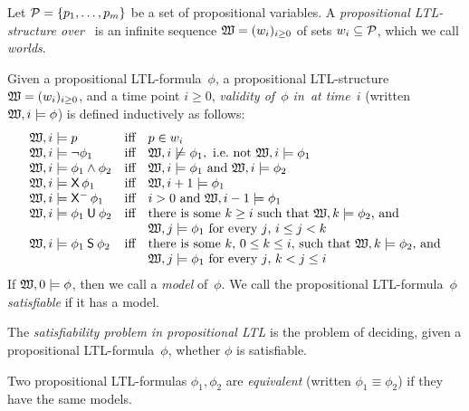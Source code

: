 \begin{definition}\label{def:semantics-ltl}
    Let $\mathcal{P}=\{p_1,\dots,p_m\}$ be a set of propositional variables.  A
    \emph{propositional LTL-structure over~\Pmc} is an infinite sequence
    $\mathfrak{W}=(w_i)_{i\ge 0}$ of sets $w_i\subseteq\mathcal{P}$, which we call
    \emph{worlds}.

    Given a propositional LTL-formula~$\phi$, a propositional LTL-structure
    $\mathfrak{W}=(w_i)_{i\ge 0}$, and a time point $i\ge 0$, \emph{validity of~$\phi$
    in~\Wmf at time~$i$} (written $\mathfrak{W},i\models\phi$) is defined inductively as
    follows:
    \[\begin{array}{lcl}
        \Wmf,i\models p
            &\text{iff}
            &p\in w_i\\
        \Wmf,i\models\lnot\phi_1
            &\text{iff}
            &\Wmf,i\not\models\phi_1,\ \text{i.e.~not}\ \Wmf,i\models\phi_1\\
        \Wmf,i\models\phi_1\land\phi_2
            &\text{iff}
            &\Wmf,i\models\phi_1\ \text{and}\ \Wmf,i\models\phi_2\\
        \Wmf,i\models\Next\phi_1
            &\text{iff}
            &\Wmf,i+1\models\phi_1\\
        \Wmf,i\models\Previous\phi_1
            &\text{iff}
            &i>0\ \text{and}\ \Wmf,i-1\models\phi_1\\
        \Wmf,i\models\phi_1\Until\phi_2
            &\text{iff}
            &\text{there is some $k\geq i$ such that $\Wmf,k\models\phi_2$, and}\\
            & &\text{$\Wmf,j\models\phi_1$ for every $j$, $i\le j<k$}\\
        \Wmf,i\models\phi_1\Since\phi_2
            &\text{iff}
            &\text{there is some $k$, $0\le k\le i$, such that $\Wmf,k\models\phi_2$, and}\\
            & &\text{$\Wmf,j\models\phi_1$ for every $j$, $k<j\le i$}
    \end{array}\]
    If $\mathfrak{W},0\models\phi$, then we call \Wmf a \emph{model} of~$\phi$.  We call
    the propositional LTL-formula~$\phi$ \emph{satisfiable} if it has a model.

    The \emph{satisfiability problem in propositional LTL} is the problem of
    deciding, given a propositional LTL-formula~$\phi$, whether $\phi$ is
    satisfiable.

    Two propositional LTL-formulas $\phi_1,\phi_2$ are \emph{equivalent}
    (written $\phi_1\equiv\phi_2$) if they have the same models.
\end{definition}

